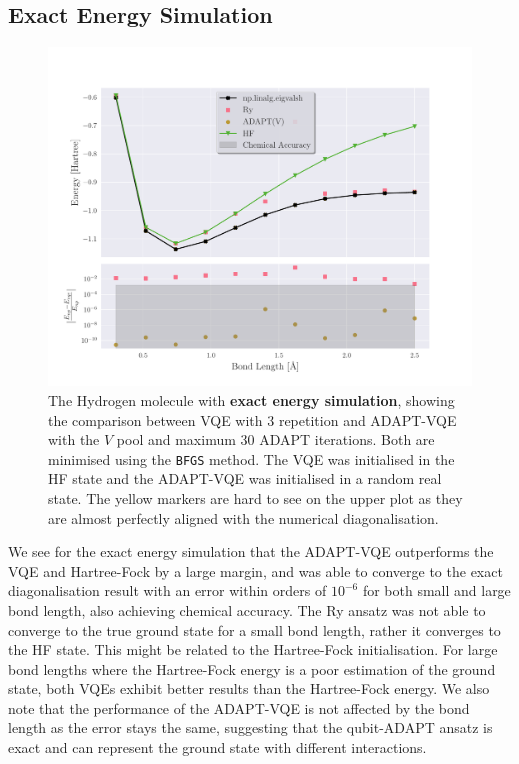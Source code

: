 \subsection{Exact Energy Simulation}
\begin{figure}[ht]
    \centering
    \includegraphics[width=\linewidth]{image/h2_result/nsn/best-nsn.pdf}
    \caption{The Hydrogen molecule with \textbf{exact energy simulation}, showing the comparison between VQE with $ 3 $ repetition and ADAPT-VQE with the $ V $ pool and maximum $ 30 $ ADAPT iterations. Both are minimised using the \texttt{BFGS} method. The VQE was initialised in the HF state and the ADAPT-VQE was initialised in a random real state. The yellow markers are hard to see on the upper plot as they are almost perfectly aligned with the numerical diagonalisation.}
    \label{fig:h2main-nsn}
\end{figure}

We see for the exact energy simulation that the ADAPT-VQE outperforms the VQE and Hartree-Fock by a large margin, and was able to converge to the exact diagonalisation result with an error within orders of $ 10^{-6} $ for both small and large bond length, also achieving chemical accuracy. The Ry ansatz was not able to converge to the true ground state for a small bond length, rather it converges to the HF state. This might be related to the Hartree-Fock initialisation. For large bond lengths where the Hartree-Fock energy is a poor estimation of the ground state, both VQEs exhibit better results than the Hartree-Fock energy. We also note that the performance of the ADAPT-VQE is not affected by the bond length as the error stays the same, suggesting that the qubit-ADAPT ansatz is exact and can represent the ground state with different interactions.


